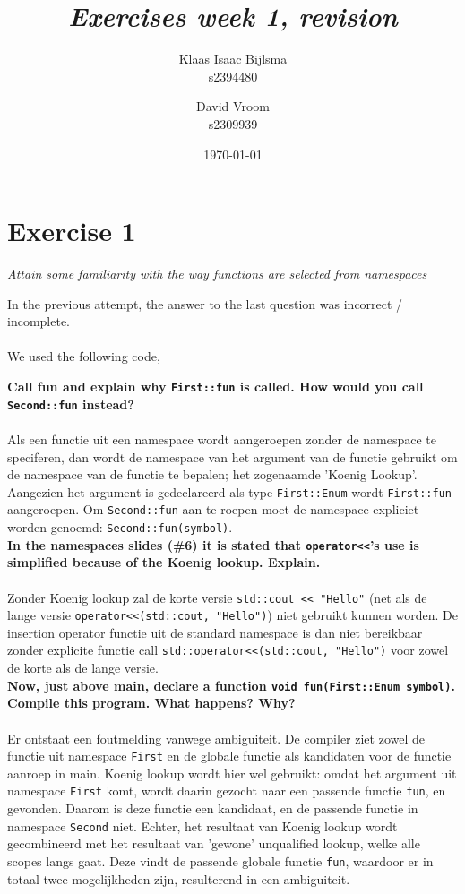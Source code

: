 \documentclass[12pt]{article}
\title{\itshape Exercises week 1, revision}
\author{
	Klaas Isaac Bijlsma \\ s2394480
	\and
	David Vroom \\ s2309939
}
\date{\today}
\newcommand{\desc}[1]{\textit{#1} \vspace{1em}}
\begin{document}
\maketitle
\section*{Exercise 1}
\desc{Attain some familiarity with the way functions are selected from namespaces}

In the previous attempt, the answer to the last question was incorrect / incomplete.\\\\
We used the following code,


\textbf{Call fun and explain why \texttt{First::fun} is called. How would you call \texttt{Second::fun} instead?}\\
\\
Als een functie uit een namespace wordt aangeroepen zonder de namespace te speciferen, dan wordt de namespace van het argument van de functie gebruikt om de namespace van de functie te bepalen; het zogenaamde 'Koenig Lookup'. Aangezien het argument is gedeclareerd als type \texttt{First::Enum} wordt \texttt{First::fun} aangeroepen. Om \texttt{Second::fun} aan te roepen moet de namespace expliciet worden genoemd: \texttt{Second::fun(symbol)}.\\

\textbf{In the namespaces slides (\#6) it is stated that \texttt{operator<<}'s use is simplified because of the Koenig lookup. Explain.}\\
\\
Zonder Koenig lookup zal de korte versie \texttt{std::cout << "Hello"} (net als de lange versie \texttt{operator<<(std::cout, "Hello")}) niet gebruikt kunnen worden. De insertion operator functie uit de standard namespace is dan niet bereikbaar zonder explicite functie call \texttt{std::operator<<(std::cout, "Hello")} voor zowel de korte als de lange versie.\\

\textbf{Now, just above main, declare a function \texttt{void fun(First::Enum symbol)}. Compile this program. What happens? Why?}\\
\\
Er ontstaat een foutmelding vanwege ambiguiteit. De compiler ziet zowel de functie uit namespace \texttt{First} en de globale functie als kandidaten voor de functie aanroep in main. Koenig lookup wordt hier wel gebruikt: omdat het argument uit namespace \texttt{First} komt, wordt daarin gezocht naar een passende functie \texttt{fun}, en gevonden. Daarom is deze functie een kandidaat, en de passende functie in namespace \texttt{Second} niet. Echter, het resultaat van Koenig lookup wordt gecombineerd met het resultaat van 'gewone' unqualified lookup, welke alle scopes langs gaat. Deze vindt de passende globale functie \texttt{fun}, waardoor er in totaal twee mogelijkheden zijn, resulterend in een ambiguiteit.


\clearpage
\end{document}
